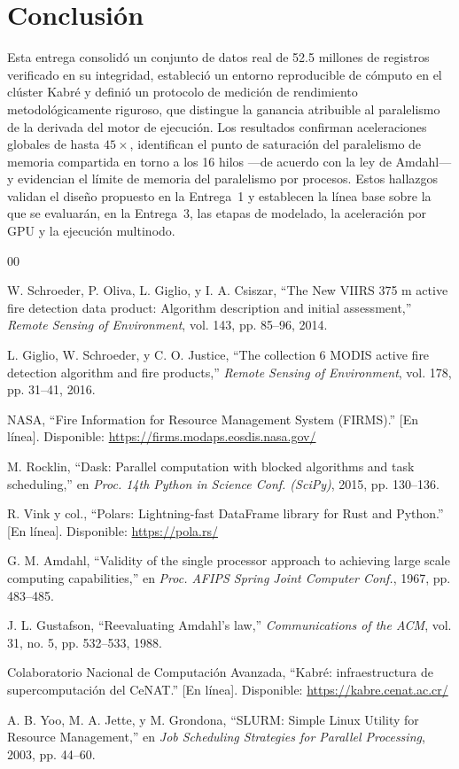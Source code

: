 \documentclass[conference]{IEEEtran}
\begin{document}
\section{Conclusión}

Esta entrega consolidó un conjunto de datos real de 52.5 millones de registros verificado en su integridad, estableció un entorno reproducible de cómputo en el clúster Kabré y definió un protocolo de medición de rendimiento metodológicamente riguroso, que distingue la ganancia atribuible al paralelismo de la derivada del motor de ejecución. Los resultados confirman aceleraciones globales de hasta $45\times$, identifican el punto de saturación del paralelismo de memoria compartida en torno a los 16 hilos —de acuerdo con la ley de Amdahl— y evidencian el límite de memoria del paralelismo por procesos. Estos hallazgos validan el diseño propuesto en la Entrega~1 y establecen la línea base sobre la que se evaluarán, en la Entrega~3, las etapas de modelado, la aceleración por GPU y la ejecución multinodo.

\begin{thebibliography}{00}

W. Schroeder, P. Oliva, L. Giglio, y I. A. Csiszar, ``The New VIIRS 375 m active fire detection data product: Algorithm description and initial assessment,'' \textit{Remote Sensing of Environment}, vol. 143, pp. 85--96, 2014.

L. Giglio, W. Schroeder, y C. O. Justice, ``The collection 6 MODIS active fire detection algorithm and fire products,'' \textit{Remote Sensing of Environment}, vol. 178, pp. 31--41, 2016.

NASA, ``Fire Information for Resource Management System (FIRMS).'' [En línea]. Disponible: \url{https://firms.modaps.eosdis.nasa.gov/}

M. Rocklin, ``Dask: Parallel computation with blocked algorithms and task scheduling,'' en \textit{Proc. 14th Python in Science Conf. (SciPy)}, 2015, pp. 130--136.

R. Vink y col., ``Polars: Lightning-fast DataFrame library for Rust and Python.'' [En línea]. Disponible: \url{https://pola.rs/}

G. M. Amdahl, ``Validity of the single processor approach to achieving large scale computing capabilities,'' en \textit{Proc. AFIPS Spring Joint Computer Conf.}, 1967, pp. 483--485.

J. L. Gustafson, ``Reevaluating Amdahl's law,'' \textit{Communications of the ACM}, vol. 31, no. 5, pp. 532--533, 1988.

Colaboratorio Nacional de Computación Avanzada, ``Kabré: infraestructura de supercomputación del CeNAT.'' [En línea]. Disponible: \url{https://kabre.cenat.ac.cr/}

A. B. Yoo, M. A. Jette, y M. Grondona, ``SLURM: Simple Linux Utility for Resource Management,'' en \textit{Job Scheduling Strategies for Parallel Processing}, 2003, pp. 44--60.

\end{thebibliography}
\end{document}
